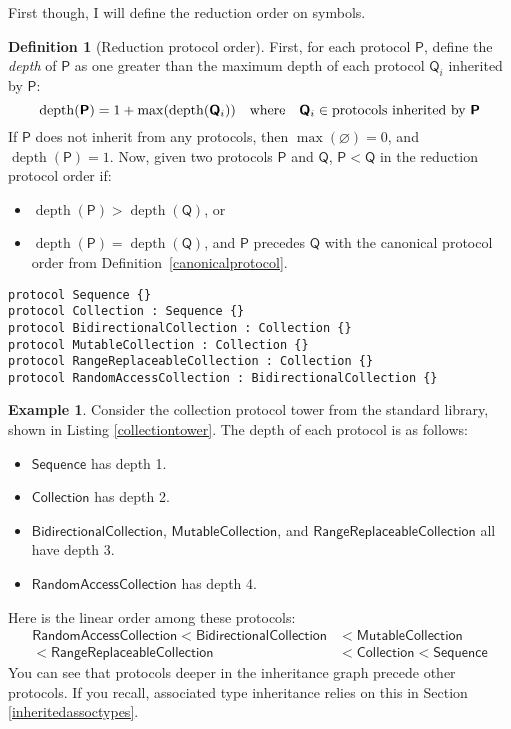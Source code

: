 \documentclass[headsepline,bibliography=totoc]{scrreport}
\newcommand{\proto}[1]{\bm{\mathsf{#1}}}
\DeclareMathOperator{\gpdepth}{depth}
\theoremstyle{definition}
\newtheorem{example}{Example}[chapter]
\theoremstyle{definition}
\newtheorem{definition}{Definition}[chapter]
\theoremstyle{definition}
\begin{document}
First though, I will define the reduction order on symbols.

\begin{definition}[Reduction protocol order]\label{protocolorder} First, for each protocol $\proto{P}$, define the \emph{depth} of $\proto{P}$ as one greater than the maximum depth of each protocol $\proto{Q}_i$ inherited by $\proto{P}$:
\[\gpdepth(\proto{P}) = 1 + \max(\gpdepth(\proto{Q}_i))\quad\hbox{where}\quad \bm{\mathsf{Q}}_i \in \hbox{protocols inherited by $\proto{P}$}\]
If $\proto{P}$ does not inherit from any protocols, then $\max(\varnothing)=0$, and $\gpdepth(\proto{P})=1$. Now, given two protocols $\proto{P}$ and $\proto{Q}$, $\proto{P}<\proto{Q}$ in the reduction protocol order if:

\begin{itemize}
\item $\gpdepth(\proto{P}) > \gpdepth(\proto{Q})$, or
\item $\gpdepth(\proto{P}) = \gpdepth(\proto{Q})$, and $\proto{P}$ precedes $\proto{Q}$ with the canonical protocol order from Definition~\ref{canonicalprotocol}.
\end{itemize}
\end{definition}
\begin{listing}\caption{The standard library's Collection protocol tower}\label{collectiontower}
\begin{Verbatim}
protocol Sequence {}
protocol Collection : Sequence {}
protocol BidirectionalCollection : Collection {}
protocol MutableCollection : Collection {}
protocol RangeReplaceableCollection : Collection {}
protocol RandomAccessCollection : BidirectionalCollection {}
\end{Verbatim}
\end{listing}
\begin{example}
Consider the collection protocol tower from the standard library, shown in Listing \ref{collectiontower}. The depth of each protocol is as follows:
\begin{itemize}
\item $\proto{Sequence}$ has depth 1.
\item $\proto{Collection}$ has depth 2.
\item $\proto{BidirectionalCollection}$, $\proto{MutableCollection}$, and $\proto{RangeReplaceableCollection}$ all have depth 3.
\item $\proto{RandomAccessCollection}$ has depth 4.
\end{itemize}
Here is the linear order among these protocols:
\begin{align*}\proto{RandomAccessCollection}<\proto{BidirectionalCollection}&<\proto{MutableCollection}\\
<\proto{RangeReplaceableCollection}&<\proto{Collection}<\proto{Sequence}
\end{align*}
You can see that protocols deeper in the inheritance graph precede other protocols. If you recall, associated type inheritance relies on this in Section \ref{inheritedassoctypes}.
\end{example}
\end{document}
